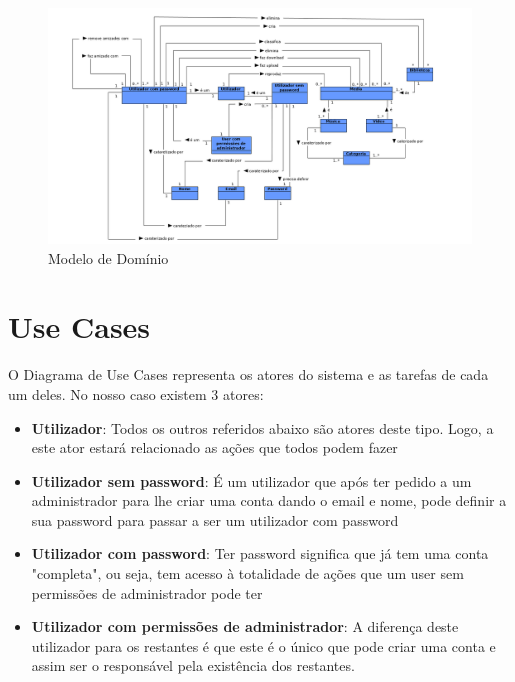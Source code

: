 \documentclass[a4paper]{report}
\begin{document}
\begin{figure}[H]
	\centering 
    \includegraphics[width=\textwidth]{images/Dominio.png}  
    \caption{Modelo de Domínio}
\end{figure}


\chapter{Use Cases}

O Diagrama de Use Cases representa os atores do sistema e as tarefas de cada um
deles. No nosso caso existem 3 atores:
\begin{itemize}
    \item \textbf{Utilizador}: Todos os outros referidos abaixo são atores deste
        tipo. Logo, a este ator estará relacionado as ações que todos podem
        fazer
    \item \textbf{Utilizador sem password}: É um utilizador que após ter pedido
        a um administrador para lhe criar uma conta dando o email e nome, pode
        definir a sua password para passar a ser um utilizador com password
    \item \textbf{Utilizador com password}: Ter password significa que já tem
        uma conta "completa", ou seja, tem acesso à totalidade de ações que um
        user sem permissões de administrador pode ter
    \item \textbf{Utilizador com permissões de administrador}: A diferença deste 
        utilizador para os restantes é que este é o único que pode criar uma
        conta e assim ser o responsável pela existência dos restantes.
\end{itemize}
\end{document}
